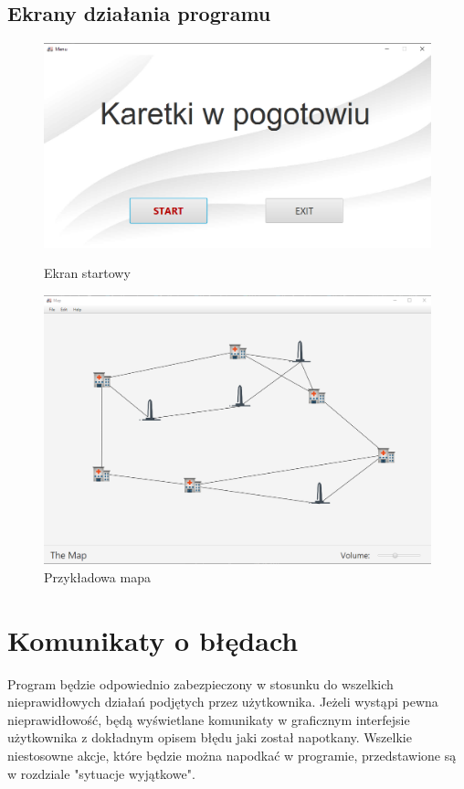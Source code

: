 \documentclass{article}
\begin{document}
\subsection{Ekrany działania programu}
{\fontsize{14}{14}\selectfont 
\begin{figure}[!h]
    \centering
    \includegraphics[width=1\textwidth]{images/ekran_startowy.png}
    \caption{Ekran startowy}
    
    \vspace*{\floatsep}
    
    \includegraphics[width=1\textwidth]{images/przykladowa_mapa.png}
    \caption{Przykładowa mapa}
\end{figure}

\newline}

\section{Komunikaty o błędach}
{\fontsize{14}{14}\selectfont 
Program będzie odpowiednio zabezpieczony w stosunku do wszelkich nieprawidłowych działań podjętych przez użytkownika. Jeżeli wystąpi pewna nieprawidłowość, będą wyświetlane komunikaty w graficznym interfejsie użytkownika z dokładnym opisem błędu jaki został napotkany. Wszelkie niestosowne akcje, które będzie można napodkać w programie, przedstawione są w rozdziale "sytuacje wyjątkowe".
}
\end{document}
